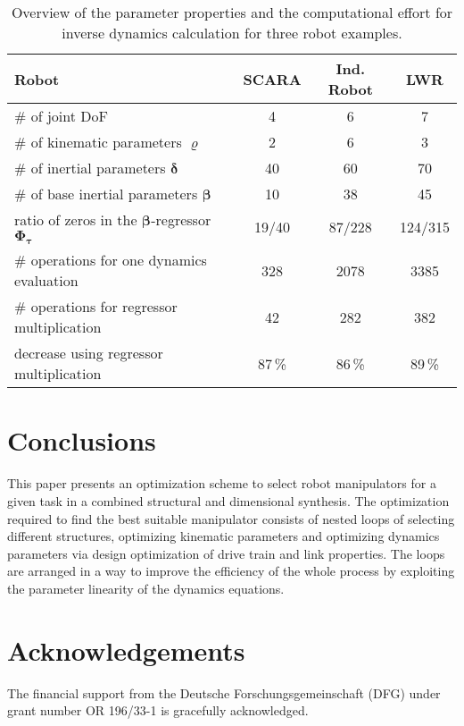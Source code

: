 \documentclass{svproc}
\newcommand{\bm}[1]{\boldsymbol{#1}}
\begin{document}
\begin{table}[tb]
    \caption{Overview of the parameter properties and the computational effort for inverse dynamics calculation for three robot examples.}
    \label{tab:computation}
    \centering
    \setlength\tabcolsep{3pt}
    \small
    \begin{tabular}[t]{|l|c|c|c|} 
        \hline
        Robot & SCARA & Ind. Robot & LWR \\
        \hline
        \# of joint DoF  & 4 & 6 & 7 \\
        \# of kinematic parameters $\bm{\varrho}$ & 2 & 6 & 3 \\
        \# of inertial parameters $\bm{\delta}$ & 40 & 60 & 70 \\
        \# of base inertial parameters $\bm{\beta}$ & 10 & 38 & 45 \\
        ratio of zeros in the $\bm{\beta}$-regressor $\bm{\Phi}_{\bm{\tau}}$ & 19/40 & 87/228 & 124/315 \\
        \hline
        \# operations for one dynamics evaluation & 328 & 2078 & 3385 \\
        \# operations for regressor multiplication & 42 & 282 & 382 \\
        decrease using regressor multiplication & 87\,\% & 86\,\% & 89\,\% \\
        \hline
    \end{tabular}
    \vspace{-0.5cm}
\end{table}


\section{Conclusions}
\label{sec:Conclusion}


This paper presents an optimization scheme to select robot manipulators for a given task in a combined structural and dimensional synthesis.
The optimization required to find the best suitable manipulator consists of nested loops of selecting different structures, optimizing kinematic parameters and optimizing dynamics parameters via design optimization of drive train and link properties.
The loops are arranged in a way to improve the efficiency of the whole process by exploiting the parameter linearity of the dynamics equations.

\section*{Acknowledgements}

The financial support from the Deutsche Forschungsgemeinschaft (DFG) under grant number OR 196/33-1 is gracefully acknowledged.



\end{document}
